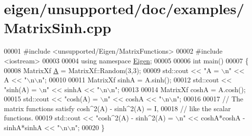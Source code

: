 \hypertarget{eigen_2unsupported_2doc_2examples_2_matrix_sinh_8cpp_source}{}\section{eigen/unsupported/doc/examples/\+Matrix\+Sinh.cpp}
\label{eigen_2unsupported_2doc_2examples_2_matrix_sinh_8cpp_source}

\begin{DoxyCode}
00001 \textcolor{preprocessor}{#include <unsupported/Eigen/MatrixFunctions>}
00002 \textcolor{preprocessor}{#include <iostream>}
00003 
00004 \textcolor{keyword}{using namespace }\hyperlink{namespace_eigen}{Eigen};
00005 
00006 \textcolor{keywordtype}{int} main()
00007 \{
00008   MatrixXf \hyperlink{group___core___module_class_eigen_1_1_matrix}{A} = MatrixXf::Random(3,3);
00009   std::cout << \textcolor{stringliteral}{"A = \(\backslash\)n"} << A << \textcolor{stringliteral}{"\(\backslash\)n\(\backslash\)n"};
00010 
00011   MatrixXf sinhA = A.sinh();
00012   std::cout << \textcolor{stringliteral}{"sinh(A) = \(\backslash\)n"} << sinhA << \textcolor{stringliteral}{"\(\backslash\)n\(\backslash\)n"};
00013 
00014   MatrixXf coshA = A.cosh();
00015   std::cout << \textcolor{stringliteral}{"cosh(A) = \(\backslash\)n"} << coshA << \textcolor{stringliteral}{"\(\backslash\)n\(\backslash\)n"};
00016   
00017   \textcolor{comment}{// The matrix functions satisfy cosh^2(A) - sinh^2(A) = I, }
00018   \textcolor{comment}{// like the scalar functions.}
00019   std::cout << \textcolor{stringliteral}{"cosh^2(A) - sinh^2(A) = \(\backslash\)n"} << coshA*coshA - sinhA*sinhA << \textcolor{stringliteral}{"\(\backslash\)n\(\backslash\)n"};
00020 \}
\end{DoxyCode}
